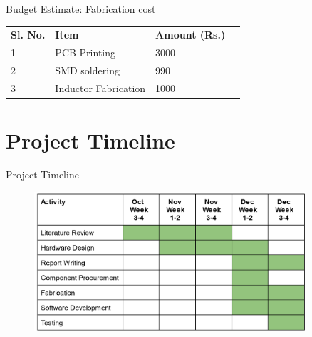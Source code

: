 \documentclass[aspectratio=169]{beamer}
\begin{document}
	
	\begin{frame}{Budget Estimate: Fabrication cost}
		\begin{table}[]
			\begin{tabular}{|l|l|l|l}
				\cline{1-3}
				\textbf{Sl. No.} & \textbf{Item}        & \textbf{Amount (Rs.)} &  \\ \cline{1-3}
				1                & PCB Printing         & 3000                    &  \\ \cline{1-3}
				2                & SMD soldering        & 990                    &  \\ \cline{1-3}
				3                & Inductor Fabrication & 1000                  &  \\ \cline{1-3}
			\end{tabular}
		\end{table}
	\end{frame}
	
	
	\section{Project Timeline}

	
	
	
	\begin{frame}{Project Timeline}
		
			\begin{figure}[h]
			\centering
			\includegraphics[width=0.9\textwidth]{tl.png}
			\label{fig:timel}
		\end{figure}

	\end{frame}
	
	
\end{document}
